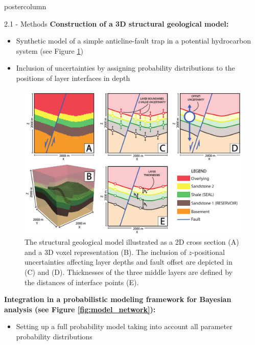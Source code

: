 \documentclass{beamer}
\begin{document}
\begin{frame}
\begin{columns}
\begin{column}{.249\textwidth}
\begin{beamercolorbox}[center]{postercolumn}
\begin{minipage}{.98\textwidth}
{\begin{myblock}{2.1 - Methods}
\textbf{Construction of a 3D structural geological model:}
	\begin{itemize}
	\item Synthetic model of a simple anticline-fault trap in a potential hydrocarbon system (see Figure \ref{fig:unc_lik})
	\item Inclusion of uncertainties by assigning probability distributions to the positions of layer interfaces in depth
	\end{itemize}							
								\vspace{0.5em}
								\begin{figure}
									\begin{minipage}{0.95\textwidth}
										\centering\includegraphics[width=1\textwidth]{figures/Uncertainties_Likelihoods}
										\caption{The structural geological model illustrated as a 2D cross section (A) and a 3D voxel representation (B). The inclusion of $z$-positional uncertainties affecting layer depths and fault offset are depicted in (C) and (D). Thicknesses of the three middle layers are defined by the distances of interface points (E).}
										\label{fig:unc_lik}
									\end{minipage}
								\end{figure}
\textbf{Integration in a probabilistic modeling framework for Bayesian analysis (see Figure \ref{fig:model_network}):}
	\begin{itemize}
	\item Setting up a full probability model taking into account all parameter probability distributions

\end{itemize}
\end{myblock}}
\end{minipage}
\end{beamercolorbox}
\end{column}
\end{columns}
\end{frame}
\end{document}
